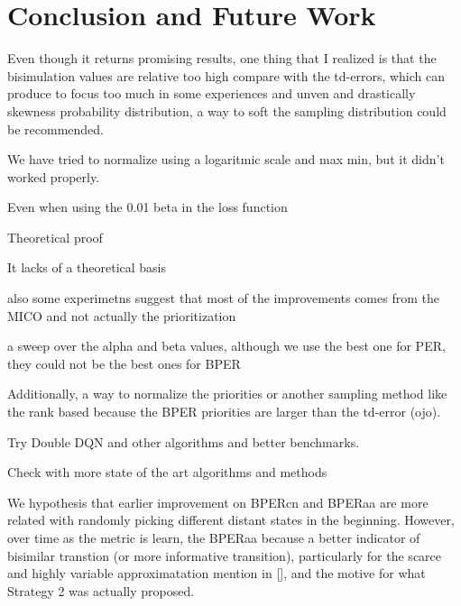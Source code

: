 
\chapter{Conclusion and Future Work}

Even though it returns promising results, one thing that I realized is that the bisimulation values are relative too high compare with the td-errors, which can produce to focus too much in some experiences and unven and drastically skewness probability distribution, a way to soft the sampling distribution could be recommended. 

We have tried to normalize using a logaritmic scale and max min, but it didn't worked properly.

Even when using the 0.01 beta in the loss function

Theoretical proof

It lacks of a theoretical basis

also some experimetns suggest that most of the improvements comes from the MICO and not actually the prioritization

a sweep over the alpha and beta values, although we use the best one for PER, they could not be the best ones for BPER

Additionally, a way to normalize the priorities or another sampling method like the rank based because the BPER priorities are larger than the td-error (ojo).

Try Double DQN and other algorithms and better benchmarks.

Check with more state of the art algorithms and methods


We hypothesis that earlier improvement on BPERcn and BPERaa are more related with randomly picking different distant states in the beginning. However, over time as the metric is learn, the BPERaa because a better indicator of bisimilar transtion (or more informative transition), particularly for the scarce and highly variable approximatation mention in [], and the motive for what Strategy 2 was actually proposed.






